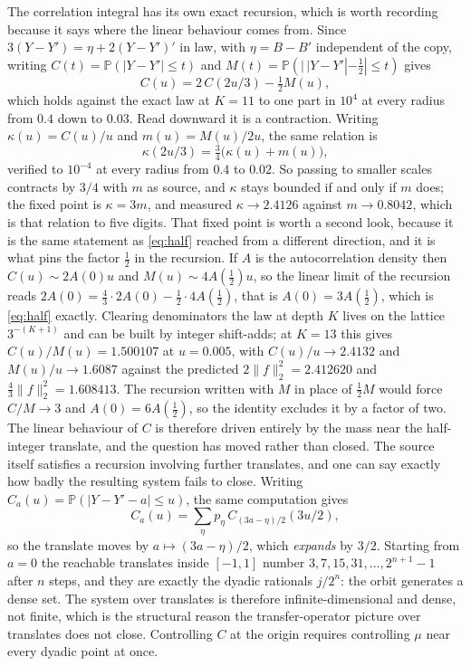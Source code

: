 \documentclass[11pt]{article}
\theoremstyle{remark}
\begin{document}
The correlation integral has its own exact recursion, which is worth recording because it says where the
linear behaviour comes from. Since $3(Y-Y')=\eta+2(Y-Y')'$ in law, with $\eta=B-B'$ independent of the
copy, writing $C(t)=\mathbb P(|Y-Y'|\le t)$ and $M(t)=\mathbb P(|\,|Y-Y'|-\tfrac12|\le t)$ gives
\[
  C(u)=2\,C(2u/3)-\tfrac12M(u),
\]
which holds against the exact law at $K=11$ to one part in $10^4$ at every radius from $0.4$ down to
$0.03$.
Read downward it is a contraction. Writing $\kappa(u)=C(u)/u$ and $m(u)=M(u)/2u$, the same relation is
\[
  \kappa(2u/3)=\tfrac34\bigl(\kappa(u)+m(u)\bigr),
\]
verified to $10^{-4}$ at every radius from $0.4$ to $0.02$. So passing to smaller scales contracts by
$3/4$ with $m$ as source, and $\kappa$ stays bounded if and only if $m$ does; the fixed point is
$\kappa=3m$, and measured $\kappa\to2.4126$ against $m\to0.8042$, which is that relation to five digits.
That fixed point is worth a second look, because it is the same statement as \eqref{eq:half} reached from
a different direction, and it is what pins the factor $\tfrac12$ in the recursion. If $A$ is the
autocorrelation density then $C(u)\sim2A(0)u$ and $M(u)\sim4A(\tfrac12)u$, so the linear limit of the
recursion reads $2A(0)=\tfrac43\cdot2A(0)-\tfrac12\cdot4A(\tfrac12)$, that is $A(0)=3A(\tfrac12)$, which is
\eqref{eq:half} exactly. Clearing denominators the law at depth $K$ lives on the lattice $3^{-(K+1)}$ and
can be built by integer shift-adds; at $K=13$ this gives $C(u)/M(u)=1.500107$ at $u=0.005$, with
$C(u)/u\to2.4132$ and $M(u)/u\to1.6087$ against the predicted $2\|f\|_2^2=2.412620$ and
$\tfrac43\|f\|_2^2=1.608413$. The recursion written with $M$ in place of $\tfrac12M$ would force
$C/M\to3$ and $A(0)=6A(\tfrac12)$, so the identity excludes it by a factor of two.
The linear behaviour of $C$ is therefore driven entirely by the mass near the half-integer translate, and
the question has moved rather than closed. The source itself satisfies a recursion involving further translates, and one can
say exactly how badly the resulting system fails to close. Writing $C_a(u)=\mathbb P(|Y-Y'-a|\le u)$, the
same computation gives
\[
  C_a(u)=\sum_{\eta}p_\eta\,C_{(3a-\eta)/2}(3u/2),
\]
so the translate moves by $a\mapsto(3a-\eta)/2$, which \emph{expands} by $3/2$. Starting from $a=0$ the
reachable translates inside $[-1,1]$ number $3,7,15,31,\dots,2^{n+1}-1$ after $n$ steps, and they are
exactly the dyadic rationals $j/2^n$: the orbit generates a dense set. The system over translates is
therefore infinite-dimensional and dense, not finite, which is the structural reason the
transfer-operator picture over translates does not close. Controlling $C$ at the origin requires
controlling $\mu$ near every dyadic point at once.
\end{document}
